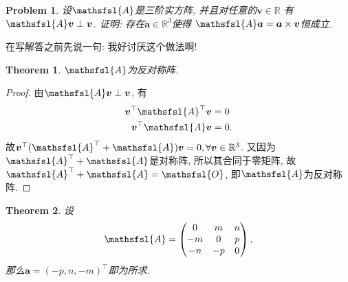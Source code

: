 \documentclass[a4paper,12pt]{ctexart}
\title{\TITLE}
\author{\AUTHOR}
\date{\today}
\newtheorem{theorem}{Theorem}[section]
\theoremstyle{plain}
\newtheorem{problem}{Problem}[section]
\theoremstyle{plain}
\theoremstyle{plain}
\theoremstyle{nonumberplain}
\newtheorem{proof}{Proof}
\newcommand{\br}{\mathbb{R}}
\newcommand{\matr}[1]{\ensuremath{\mathsfsl{#1}}} %
\newcommand{\vect}[1]{\bm{#1}}
\begin{document}

    \maketitle
    \thispagestyle{empty}





    \newpage
    \pagestyle{fancy}
    \linenumbers

    \begin{problem}
        设$\matr{A}$是三阶实方阵, 并且对任意的$\vect{v}\in\br$
        有$\matr{A}\vect{v}\perp\vect{v}$.
        证明: 存在$\vect{a}\in\br^{3}$使得
        $\matr{A}\vect{a}=\vect{a}\times\vect{v}$恒成立.
    \end{problem}

    {\huge{在写解答之前先说一句: 我好讨厌这个做法啊!}}

    \begin{theorem}
        \label{theorem_antisymmetric}
        $\matr{A}$为反对称阵.
    \end{theorem}

    \begin{proof}
        由$\matr{A}\vect{v}\perp\vect{v}$,
        有
        \begin{equation}
        \begin{aligned}
            \vect{v}^{\top}\matr{A}^{\top}\vect{v} &= 0\\
            \vect{v}^{\top}\matr{A}\vect{v} &= 0.
        \end{aligned}
        \end{equation}
        故$\vect{v}^{\top}(\matr{A}^{\top}+\matr{A})\vect{v}=0,
        \forall\vect{v}\in\br^{3}$.
        又因为$\matr{A}^{\top}+\matr{A}$是对称阵, 所以其合同于零矩阵,
        故$\matr{A}^{\top}+\matr{A}=\matr{O}$, 即$\matr{A}$为反对称阵.
    \end{proof}

    \begin{theorem}
        设
        \begin{equation}
            \label{equation_defineA}
            \matr{A}=
            \begin{pmatrix}
                0 & m & n\\
                -m & 0 & p\\
                -n & -p & 0
            \end{pmatrix},
        \end{equation}
        那么$\vect{a}=(-p, n, -m)^{\top}$即为所求.
    \end{theorem}
\end{document}
